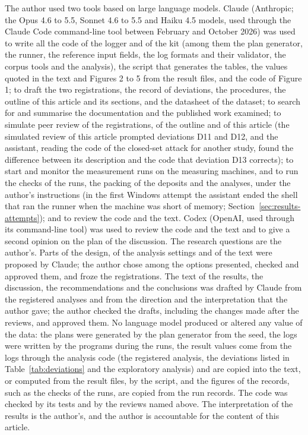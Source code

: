 The author used two tools based on large language models. Claude (Anthropic; the Opus 4.6 to 5.5, Sonnet 4.6 to 5.5
and Haiku 4.5 models, used through the Claude Code command-line tool between February and October 2026) was used to
write all the code of the logger and of the kit (among them the plan generator, the runner, the reference input fields,
the log formats and their validator, the corpus tools and the analysis), the script that generates the tables, the
values quoted in the text and Figures 2 to 5 from the result files, and the code of Figure 1; to draft the two
registrations, the record of deviations, the procedures, the outline of this article and its sections, and the
datasheet of the dataset;
to search for and summarise the documentation and the published work examined; to simulate peer review of the
registrations, of the outline and of this article (the simulated review of this article prompted deviations D11 and
D12, and the assistant, reading the code of the closed-set attack for another study, found the difference between its
description and the code that deviation D13 corrects); to start and monitor the measurement runs on the measuring
machines, and to run the checks of the runs, the packing of the deposits and the analyses, under the author's
instructions (in the first Windows attempt the assistant ended the shell that ran the runner when the machine was short
of memory; Section~\ref{sec:results-attempts}); and to review the code and the text. Codex (OpenAI, used through its
command-line tool) was used to review the code and the text and to give a second opinion on the plan of the
discussion. The research questions are the author's. Parts of the design, of the analysis settings and of the text
were proposed by Claude; the author chose among the options presented, checked and approved them, and froze the
registrations. The text of the results, the discussion, the recommendations and the conclusions was drafted by Claude
from the registered analyses and from the direction and the interpretation that the author gave; the author checked
the drafts, including the changes made after the reviews, and approved them. No language model produced or altered
any value of the data: the plans were generated by the plan generator from the seed, the logs were written by the
programs during the runs, the result values come from the logs through the analysis code (the registered analysis,
the deviations listed in Table~\ref{tab:deviations} and the exploratory analysis) and are copied into the text, or
computed from the result files, by the script, and the figures of the records, such as
the checks of the runs, are copied from the run records. The code was checked by its tests and by the reviews named
above. The interpretation of the results is the author's, and the author is accountable for the content of this
article.

